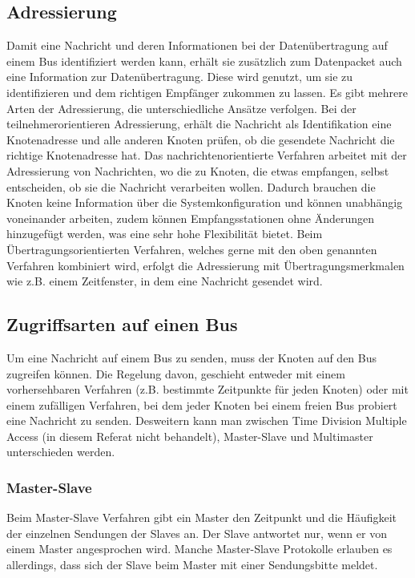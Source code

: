     \subsection{Adressierung}
    Damit eine Nachricht und deren Informationen bei der Datenübertragung auf einem Bus identifiziert werden kann, erhält sie zusätzlich zum Datenpacket auch eine Information zur Datenübertragung.
    Diese wird genutzt, um sie zu identifizieren und dem richtigen Empfänger zukommen zu lassen.
    Es gibt mehrere Arten der Adressierung, die unterschiedliche Ansätze verfolgen.
    Bei der teilnehmerorientieren Adressierung, erhält die Nachricht als Identifikation eine Knotenadresse und alle anderen Knoten prüfen, ob die gesendete Nachricht die richtige Knotenadresse hat.
    Das nachrichtenorientierte Verfahren arbeitet mit der Adressierung von Nachrichten, wo die zu Knoten, die etwas empfangen, selbst entscheiden, ob sie die Nachricht verarbeiten wollen.
    Dadurch brauchen die Knoten keine Information über die Systemkonfiguration und können unabhängig voneinander arbeiten, zudem können Empfangsstationen ohne Änderungen hinzugefügt werden, was eine sehr hohe Flexibilität bietet.
    Beim Übertragungsorientierten Verfahren, welches gerne mit den oben genannten Verfahren kombiniert wird, erfolgt die Adressierung mit Übertragungsmerkmalen wie z.B. einem Zeitfenster, in dem eine Nachricht gesendet wird. 

    \subsection{Zugriffsarten auf einen Bus}
    Um eine Nachricht auf einem Bus zu senden, muss der Knoten auf den Bus zugreifen können.
    Die Regelung davon, geschieht entweder mit einem vorhersehbaren Verfahren (z.B. bestimmte Zeitpunkte für jeden Knoten) oder mit einem zufälligen Verfahren, bei dem jeder Knoten bei einem freien Bus probiert eine Nachricht zu senden.
    Desweitern kann man zwischen Time Division Multiple Access (in diesem Referat nicht behandelt), Master-Slave und Multimaster unterschieden werden.
    \subsubsection{Master-Slave}
    Beim Master-Slave Verfahren gibt ein Master den Zeitpunkt und die Häufigkeit der einzelnen Sendungen der Slaves an.
    Der Slave antwortet nur, wenn er von einem Master angesprochen wird.
    Manche Master-Slave Protokolle erlauben es allerdings, dass sich der Slave beim Master mit einer Sendungsbitte meldet. 
    
